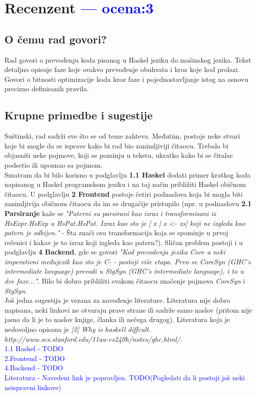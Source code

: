 \documentclass[a4paper]{report}
\newcommand{\odgovor}[1]{\textcolor{blue}{#1}}
\begin{document}
	\chapter{Recenzent \odgovor{--- ocena:3} }
	
	
	\section{O čemu rad govori?}
	Rad govori o prevođenju koda pisanog u Haskel jeziku do mašinskog jezika. Tekst detaljno opisuje faze koje ovakvo prevođenje obuhvata i kroz koje kod prolazi. Govori o bitnosti optimizacije koda kroz faze i pojednostavljanje istog na osnovu precizno definisanih pravila. 
	
	\section{Krupne primedbe i sugestije}
	Suštinski, rad sadrži sve što se od teme zahteva. Međutim, postoje neke stvari koje bi mogle da se isprave kako bi rad bio zanimljiviji čitaocu. Trebalo bi objasniti neke pojmove, koji se pominju u tekstu, ukratko kako bi se čitalac podsetio ili upoznao sa pojmom. \\ Smatram da bi bilo korisno u podglavlju \textbf{1.1 Haskel} dodati primer kratkog koda napisanog u Haskel programskom jeziku i na taj način približiti Haskel običnom čitaocu. U podglavlju \textbf{2 Frontend} postoje četiri podnaslova koja bi mogla biti zanimljivija običnom čitaocu da im se drugačije pristupilo (npr. u podnaslovu \textbf{2.1 Parsiranje} kaže se \textit{"Paterni su parsirani kao izraz i transformisani iz HsExpr.HsExp u HsPat.HsPat. Izraz kao sto je [ x | x <- xs] koji ne izgleda kao patern je odbijen."} - Šta znači ova transformacija koja se spominje u prvoj rečenici i kakav je to izraz koji izgleda kao patern?). Sličan problem postoji i u podglavlju \textbf{4 Backend}, gde se govori \textit{"Kod prevodenja jezika Core u neki imperativni međujezik kao sto je
		C- - postoji više etapa. Prvo se CoreSyn (GHC's intermediate language) prevodi u StgSyn (GHC's intermediate language), i to u dve faze..."}. Bilo bi dobro približiti svakom čitaocu značenje pojmova \textit{CoreSyn} i \textit{StgSyn}.\\
	Još jedna sugestija je vezana za navođenje literature. Literatura nije dobro napisana, neki linkovi ne otvaraju prave strane ili sadrže samo naslov (pritom nije jasno da li je to naslov knjige, članka ili nečega drugog). Literatura koja je nedovoljno opisana je \textit{[2] Why is haskell diffcult. http://www.scs.stanford.edu/11au-cs240h/notes/ghc.html/}.\\ 
	\odgovor{1.1 Haskel - TODO\\2.Frontend - TODO\\4.Backend - TODO\\Literatura - Navedeni link je popravljen. TODO(Pogledati da li postoji još neki neispravni linkove)}
	
\end{document}
